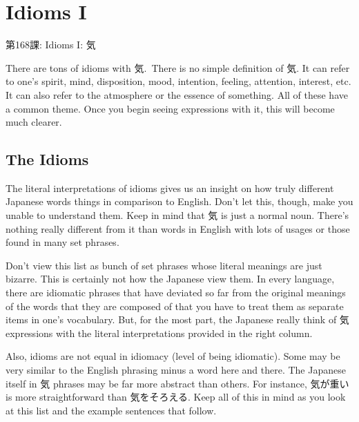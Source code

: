     
\chapter{Idioms I}

\begin{center}
\begin{Large}
第168課: Idioms I: 気 
\end{Large}
\end{center}
 
\par{ There are tons of idioms with 気. There is no simple definition of 気. It can refer to one's spirit, mind, disposition, mood, intention, feeling, attention, interest, etc. It can also refer to the atmosphere or the essence of something. All of these have a common theme. Once you begin seeing expressions with it, this will become much clearer. }
      
\section{The Idioms}
 
\par{ The literal interpretations of idioms gives us an insight on how truly different Japanese words things in comparison to English. Don't let this, though, make you unable to understand them. Keep in mind that 気 is just a normal noun. There's nothing really different from it than words in English with lots of usages or those found in many set phrases. }

\par{ Don't view this list as bunch of set phrases whose literal meanings are just bizarre. This is certainly not how the Japanese view them. In every language, there are idiomatic phrases that have deviated so far from the original meanings of the words that they are composed of that you have to treat them as separate items in one's vocabulary. But, for the most part, the Japanese really think of 気 expressions with the literal interpretations provided in the right column. }

\par{ Also, idioms are not equal in idiomacy (level of being idiomatic). Some may be very similar to the English phrasing minus a word here and there. The Japanese itself in 気 phrases may be far more abstract than others. For instance, 気が重い is more straightforward than 気をそろえる. Keep all of this in mind as you look at this list and the example sentences that follow. }

